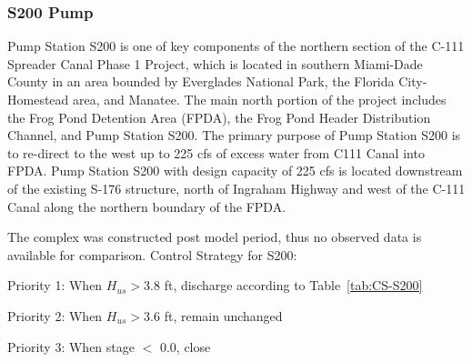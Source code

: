 %
%


\clearpage

\subsubsection{S200 Pump}
Pump Station S200 is one of key components of the northern section of the C-111 Spreader Canal Phase 1 Project, which is located in southern Miami-Dade County in an area bounded by Everglades National Park, the Florida City-Homestead area, and Manatee. The main north portion of the project includes the Frog Pond Detention Area (FPDA), the Frog Pond Header Distribution Channel, and Pump Station S200. The primary purpose of Pump Station S200 is to re-direct to the west up to 225 cfs of excess water from C111 Canal into FPDA. Pump Station S200 with design capacity of 225 cfs is located downstream of the existing S-176 structure, north of Ingraham Highway and west of the C-111 Canal along the northern boundary of the FPDA.

The complex was constructed post model period, thus no observed data is available for comparison.
Control Strategy for S200:
\begin{packed_items}
\item Priority 1: When $H_{us} > 3.8$ ft, discharge according to Table~\ref{tab:CS-S200}
\item Priority 2: When $H_{us} > 3.6$ ft, remain unchanged
\item Priority 3: When stage $<$ 0.0, close
\end{packed_items}


